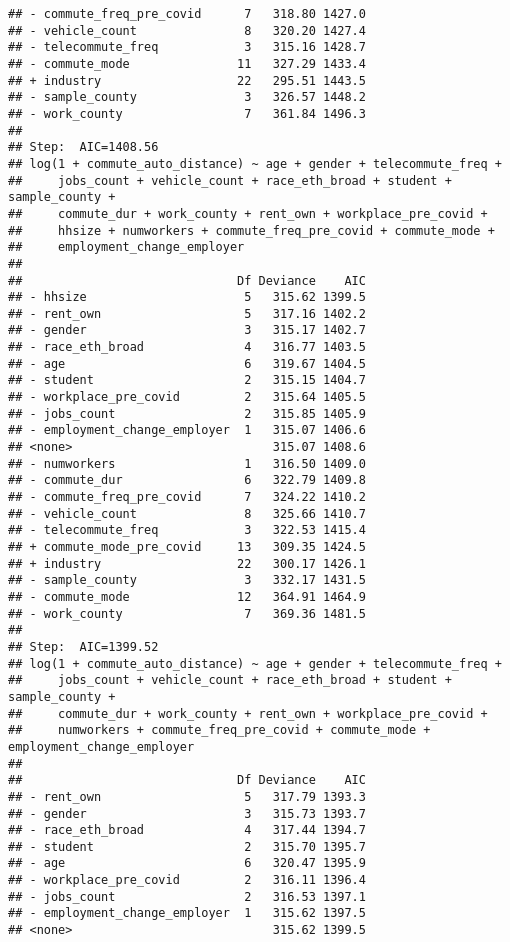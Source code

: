 \documentclass[
]{article}
\begin{document}
\begin{verbatim}
## - commute_freq_pre_covid      7   318.80 1427.0
## - vehicle_count               8   320.20 1427.4
## - telecommute_freq            3   315.16 1428.7
## - commute_mode               11   327.29 1433.4
## + industry                   22   295.51 1443.5
## - sample_county               3   326.57 1448.2
## - work_county                 7   361.84 1496.3
## 
## Step:  AIC=1408.56
## log(1 + commute_auto_distance) ~ age + gender + telecommute_freq + 
##     jobs_count + vehicle_count + race_eth_broad + student + sample_county + 
##     commute_dur + work_county + rent_own + workplace_pre_covid + 
##     hhsize + numworkers + commute_freq_pre_covid + commute_mode + 
##     employment_change_employer
## 
##                              Df Deviance    AIC
## - hhsize                      5   315.62 1399.5
## - rent_own                    5   317.16 1402.2
## - gender                      3   315.17 1402.7
## - race_eth_broad              4   316.77 1403.5
## - age                         6   319.67 1404.5
## - student                     2   315.15 1404.7
## - workplace_pre_covid         2   315.64 1405.5
## - jobs_count                  2   315.85 1405.9
## - employment_change_employer  1   315.07 1406.6
## <none>                            315.07 1408.6
## - numworkers                  1   316.50 1409.0
## - commute_dur                 6   322.79 1409.8
## - commute_freq_pre_covid      7   324.22 1410.2
## - vehicle_count               8   325.66 1410.7
## - telecommute_freq            3   322.53 1415.4
## + commute_mode_pre_covid     13   309.35 1424.5
## + industry                   22   300.17 1426.1
## - sample_county               3   332.17 1431.5
## - commute_mode               12   364.91 1464.9
## - work_county                 7   369.36 1481.5
## 
## Step:  AIC=1399.52
## log(1 + commute_auto_distance) ~ age + gender + telecommute_freq + 
##     jobs_count + vehicle_count + race_eth_broad + student + sample_county + 
##     commute_dur + work_county + rent_own + workplace_pre_covid + 
##     numworkers + commute_freq_pre_covid + commute_mode + employment_change_employer
## 
##                              Df Deviance    AIC
## - rent_own                    5   317.79 1393.3
## - gender                      3   315.73 1393.7
## - race_eth_broad              4   317.44 1394.7
## - student                     2   315.70 1395.7
## - age                         6   320.47 1395.9
## - workplace_pre_covid         2   316.11 1396.4
## - jobs_count                  2   316.53 1397.1
## - employment_change_employer  1   315.62 1397.5
## <none>                            315.62 1399.5

\end{verbatim}
\end{document}

